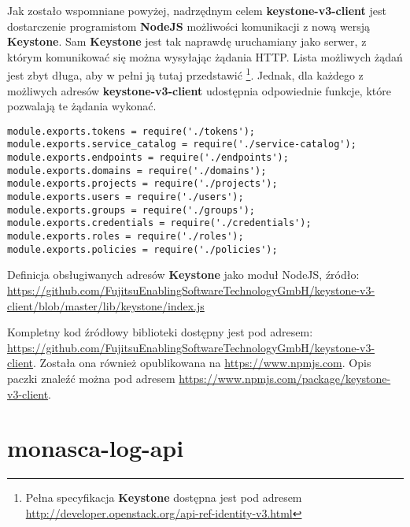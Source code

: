 Jak zostało wspomniane powyżej, nadrzędnym celem \textbf{keystone-v3-client} jest dostarczenie programistom \textbf{NodeJS} możliwości
komunikacji z nową wersją \textbf{Keystone}. Sam \textbf{Keystone} jest tak naprawdę uruchamiany jako serwer, z którym komunikować się można
wysyłając żądania HTTP. Lista możliwych żądań jest zbyt długa, aby w pełni ją tutaj przedstawić 
\footnote{Pełna specyfikacja \textbf{Keystone} dostępna jest pod adresem \url{http://developer.openstack.org/api-ref-identity-v3.html}}. Jednak,
dla każdego z możliwych adresów \textbf{keystone-v3-client} udostępnia odpowiednie funkcje, które pozwalają te żądania wykonać.
    \begin{listing}
        \begin{verbatim}
module.exports.tokens = require('./tokens');
module.exports.service_catalog = require('./service-catalog');
module.exports.endpoints = require('./endpoints');
module.exports.domains = require('./domains');
module.exports.projects = require('./projects');
module.exports.users = require('./users');
module.exports.groups = require('./groups');
module.exports.credentials = require('./credentials');
module.exports.roles = require('./roles');
module.exports.policies = require('./policies');
        \end{verbatim}
        \caption[Definicja obsługiwanych adresów \textbf{Keystone}]{
            Definicja obsługiwanych adresów \textbf{Keystone} jako moduł NodeJS, źródło: \url{https://github.com/FujitsuEnablingSoftwareTechnologyGmbH/keystone-v3-client/blob/master/lib/keystone/index.js}}
        \label{chapter:application_own:own_work:keystone_v3_client:endpoints}
    \end{listing}

Kompletny kod źródłowy biblioteki dostępny jest pod adresem: \url{https://github.com/FujitsuEnablingSoftwareTechnologyGmbH/keystone-v3-client}.
Została ona również opublikowana na \url{https://www.npmjs.com}. 
Opis paczki znaleźć można pod adresem \url{https://www.npmjs.com/package/keystone-v3-client}.

\section{monasca-log-api}


